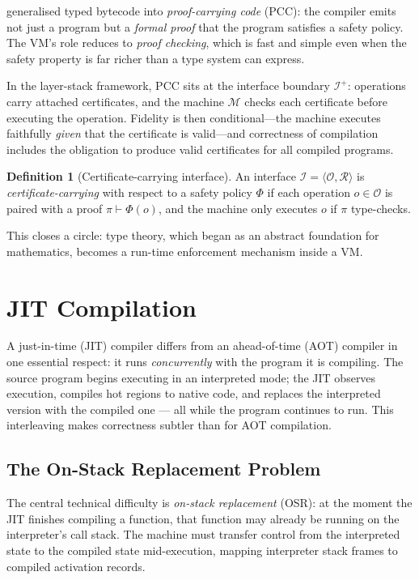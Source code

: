 \documentclass[11pt, a4paper]{article}
\theoremstyle{definition}
\newtheorem{definition}{Definition}[section]
\theoremstyle{plain}
\theoremstyle{remark}
\begin{document}
\citet{necula1997} generalised typed bytecode into \emph{proof-carrying code}
(PCC): the compiler emits not just a program but a \emph{formal proof} that
the program satisfies a safety policy. The VM's role reduces to
\emph{proof checking}, which is fast and simple even when the safety
property is far richer than a type system can express.

In the layer-stack framework, PCC sits at the interface boundary
$\mathcal{I}^+$: operations carry attached certificates, and the machine
$\mathcal{M}$ checks each certificate before executing the operation.
Fidelity is then conditional---the machine executes faithfully
\emph{given} that the certificate is valid---and correctness of
compilation includes the obligation to produce valid certificates for all
compiled programs.

\begin{definition}[Certificate-carrying interface]
  An interface $\mathcal{I} = \langle\mathcal{O}, \mathcal{R}\rangle$ is
  \emph{certificate-carrying} with respect to a safety policy $\Phi$ if
  each operation $o \in \mathcal{O}$ is paired with a proof
  $\pi \vdash \Phi(o)$, and the machine only executes $o$ if $\pi$
  type-checks.
\end{definition}

This closes a circle: type theory, which began as an abstract foundation
for mathematics, becomes a run-time enforcement mechanism inside a VM.


\section{JIT Compilation}
\label{sec:jit}

A just-in-time (JIT) compiler differs from an ahead-of-time (AOT) compiler
in one essential respect: it runs \emph{concurrently} with the program it
is compiling. The source program begins executing in an interpreted mode;
the JIT observes execution, compiles hot regions to native code, and
replaces the interpreted version with the compiled one --- all while the
program continues to run. This interleaving makes correctness subtler than
for AOT compilation.

\subsection{The On-Stack Replacement Problem}

The central technical difficulty is \emph{on-stack replacement} (OSR): at
the moment the JIT finishes compiling a function, that function may already
be running on the interpreter's call stack. The machine must transfer
control from the interpreted state to the compiled state mid-execution,
mapping interpreter stack frames to compiled activation records.
\end{document}
